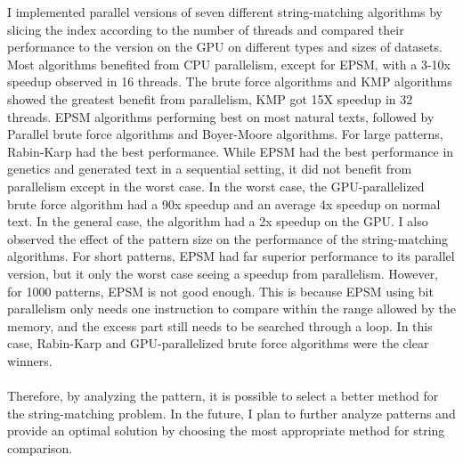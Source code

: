 \documentclass[11pt]{article}       %
\begin{document}
I implemented parallel versions of seven different string-matching algorithms by slicing the index according to the number of threads and compared their performance to the version on the GPU on different types and sizes of datasets. Most algorithms benefited from CPU parallelism, except for EPSM, with a 3-10x speedup observed in 16 threads. The brute force algorithms and KMP algorithms showed the greatest benefit from parallelism, KMP got 15X speedup in 32 threads. EPSM algorithms performing best on most natural texts, followed by Parallel brute force algorithms and Boyer-Moore algorithms. For large patterns, Rabin-Karp had the best performance. While EPSM had the best performance in genetics and generated text in a sequential setting, it did not benefit from parallelism except in the worst case. In the worst case, the GPU-parallelized brute force algorithm had a 90x speedup and an average 4x speedup on normal text. In the general case, the algorithm had a 2x speedup on the GPU. I also observed the effect of the pattern size on the performance of the string-matching algorithms. For short patterns, EPSM had far superior performance to its parallel version, but it only the worst case seeing a speedup from parallelism. However, for 1000 patterns, EPSM is not good enough. This is because EPSM using bit parallelism only needs one instruction to compare within the range allowed by the memory, and the excess part still needs to be searched through a loop. In this case, Rabin-Karp and GPU-parallelized brute force algorithms were the clear winners. \\
\\Therefore, by analyzing the pattern, it is possible to select a better method for the string-matching problem. In the future, I plan to further analyze patterns and provide an optimal solution by choosing the most appropriate method for string comparison.
\end{document}
